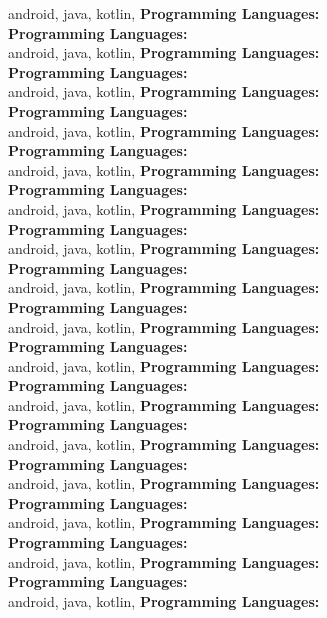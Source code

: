 android, java, kotlin, \textbf{Programming Languages:} \\
\textbf{Programming Languages:} \\
android, java, kotlin, \textbf{Programming Languages:} \\
\textbf{Programming Languages:} \\
android, java, kotlin, \textbf{Programming Languages:} \\
\textbf{Programming Languages:} \\
android, java, kotlin, \textbf{Programming Languages:} \\
\textbf{Programming Languages:} \\
android, java, kotlin, \textbf{Programming Languages:} \\
\textbf{Programming Languages:} \\
android, java, kotlin, \textbf{Programming Languages:} \\
\textbf{Programming Languages:} \\
android, java, kotlin, \textbf{Programming Languages:} \\
\textbf{Programming Languages:} \\
android, java, kotlin, \textbf{Programming Languages:} \\
\textbf{Programming Languages:} \\
android, java, kotlin, \textbf{Programming Languages:} \\
\textbf{Programming Languages:} \\
android, java, kotlin, \textbf{Programming Languages:} \\
\textbf{Programming Languages:} \\
android, java, kotlin, \textbf{Programming Languages:} \\
\textbf{Programming Languages:} \\
android, java, kotlin, \textbf{Programming Languages:} \\
\textbf{Programming Languages:} \\
android, java, kotlin, \textbf{Programming Languages:} \\
\textbf{Programming Languages:} \\
android, java, kotlin, \textbf{Programming Languages:} \\
\textbf{Programming Languages:} \\
android, java, kotlin, \textbf{Programming Languages:} \\
\textbf{Programming Languages:} \\
android, java, kotlin, \textbf{Programming Languages:} \\
